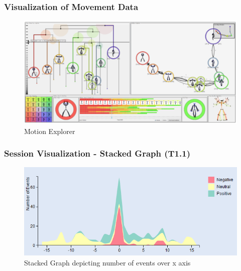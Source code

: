 \documentclass[xcolor=table]{beamer}
\begin{document}

\begin{frame}
\frametitle{Visualization of Movement Data}
\begin{figure}
\includegraphics[scale=0.4]{images/bernard_motionexplorer.png}
\caption{Motion Explorer}
\end{figure}
\end{frame}
\begin{frame}
\frametitle{Session Visualization - Stacked Graph (T1.1)}
\begin{figure}
\includegraphics[scale=0.7]{images/stackedgraph_linear.png}
\caption{Stacked Graph depicting number of events over x axis}
\end{figure}
\end{frame}
\end{document}
